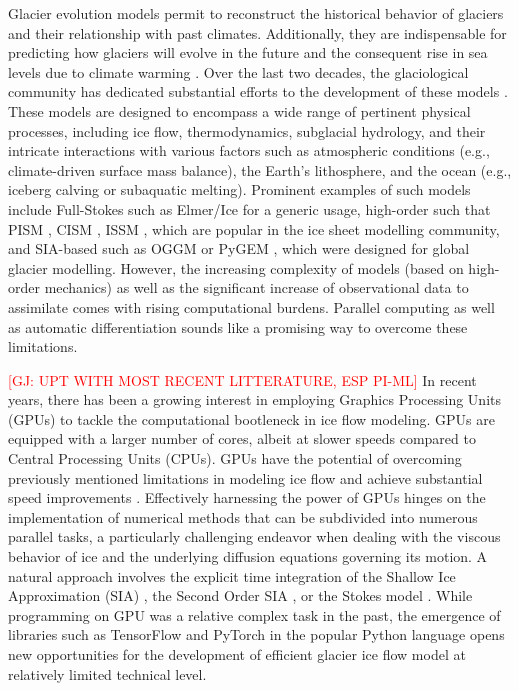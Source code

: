 \documentclass[gmd]{copernicus}
\begin{document}
Glacier evolution models permit to reconstruct the historical behavior of glaciers and their relationship with past climates. Additionally, they are indispensable 
for predicting how glaciers will evolve in the future and the consequent rise in sea levels due to climate warming \citep{pattyn2018paradigm}. Over the last two decades, the glaciological community has dedicated substantial efforts to the development of these models \citep[See the review by][]{zekollari2022ice}. These models are designed to encompass a wide range of pertinent physical processes, including ice flow, thermodynamics, subglacial hydrology, and their intricate interactions with various factors such as atmospheric conditions (e.g., climate-driven surface mass balance), the Earth's lithosphere, and the ocean (e.g., iceberg calving or subaquatic melting). Prominent examples of such models include Full-Stokes such as Elmer/Ice \citep{Gagliardini.etal.2013} for a generic usage, high-order such that PISM \citep{Winkelmann2011}, CISM \citep{lipscomb2019description}, ISSM \citep{larour2012continental}, which are popular in the ice sheet modelling community,
and SIA-based such as OGGM \citep{maussion2019open} or PyGEM \citep{rounce2020glacier}, which were designed for global glacier modelling. However, the increasing complexity of models (based on high-order mechanics) as well as the significant increase of observational data to assimilate comes with rising computational burdens. Parallel computing as well as automatic differentiation sounds like a promising way to overcome these limitations.


\textcolor{red}{[GJ: UPT WITH MOST RECENT LITTERATURE, ESP PI-ML]}
In recent years, there has been a growing interest in employing Graphics Processing Units (GPUs) to tackle the computational bootleneck in ice flow modeling. GPUs are equipped with a larger number of cores, albeit at slower speeds compared to Central Processing Units (CPUs). GPUs have the potential of overcoming previously mentioned limitations in modeling ice flow and achieve substantial speed improvements \citep{rass2020modelling}. Effectively harnessing the power of GPUs hinges on the implementation of numerical methods that can be subdivided into numerous parallel tasks, a particularly challenging endeavor when dealing with the viscous behavior of ice and the underlying diffusion equations governing its motion. A natural approach involves the explicit time integration of the Shallow Ice Approximation (SIA) \citep{vivsnjevic2020climatic}, the Second Order SIA \citep{braedstrup2014ice}, or the Stokes model \citep{rass2020modelling}. While programming on GPU was a relative complex task in the past, the emergence of libraries such as TensorFlow and PyTorch in the popular Python language opens new opportunities for the development of efficient glacier ice flow model at relatively limited technical level.
 
\end{document}
